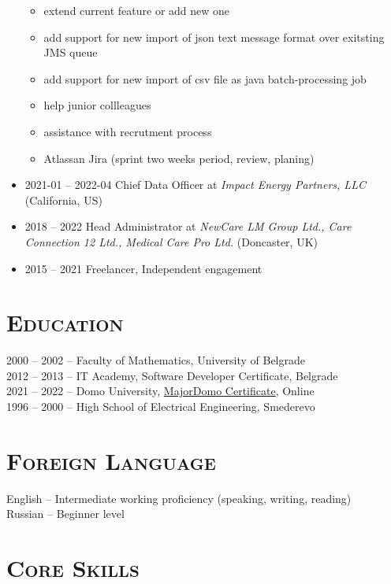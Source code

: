 \documentclass[12pt]{article}
\begin{document}
\begin{itemize}
\begin{itemize}
            \item extend current feature or add new one
            \item add support for new import of json text message format over exitsting JMS queue 
            \item add support for new import of csv file as java batch-processing job
            \item help junior collleagues
            \item assistance with recrutment process
            \item Atlassan Jira (sprint two weeks period, review, planing)
          \end{itemize}
    \item  2021-01 -- 2022-04 Chief Data Officer at \textit{Impact Energy Partners, LLC} (California, US) 
    \item  2018    -- 2022    Head Administrator at \textit{NewCare LM Group Ltd., Care Connection 12 Ltd., Medical Care Pro Ltd.} (Doncaster, UK) 
    \item  2015    -- 2021 Freelancer, Independent engagement
\end{itemize}

\section{\textsc{Education}}

    2000 -- 2002 -- Faculty of Mathematics, University of Belgrade \\
    2012 -- 2013 -- IT Academy, Software Developer Certificate, Belgrade \\
    2021 -- 2022 -- Domo University, \href{https://drive.google.com/file/d/1i-GzyE43WospitxXdFWp2bRYe6wqZG48/view?usp=sharing}{MajorDomo Certificate}, Online \\
    1996 -- 2000 -- High School of Electrical Engineering, Smederevo

\section{\textsc{Foreign Language}} 

    English -- Intermediate working proficiency (speaking, writing, reading) \\
    Russian -- Beginner level

\section{\textsc{Core Skills}}
 
\end{document}
